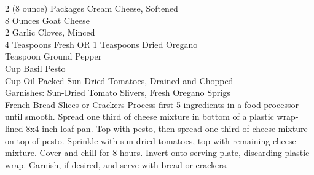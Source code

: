 {2 (8 ounce) Packages Cream Cheese, Softened \\
 8 Ounces Goat Cheese \\
 2 Garlic Cloves, Minced \\
 4 Teaspoons Fresh OR 1 Teaspoons Dried Oregano \\
  Teaspoon Ground Pepper \\
  Cup Basil Pesto \\
  Cup Oil-Packed Sun-Dried Tomatoes, Drained and Chopped \\
 Garnishes: Sun-Dried Tomato Slivers, Fresh Oregano Sprigs \\
 French Bread Slices or Crackers}
{Process first 5 ingredients in a food processor until smooth. Spread one third of cheese mixture in bottom of a plastic wrap-lined 8x4 inch loaf pan. Top with pesto, then spread one third of cheese mixture on top of pesto. Sprinkle with sun-dried tomatoes, top with remaining cheese mixture. Cover and chill for 8 hours. Invert onto serving plate, discarding plastic wrap. Garnish, if desired, and serve with bread or crackers.}
